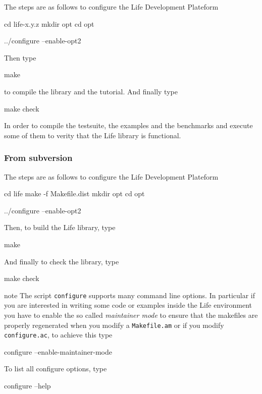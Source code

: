 \documentclass[a4paper]{book}
\newcommand{\ficnote}{note}
\newenvironment{note}{%
  \begin{pictonote}{\ficnote}}{\end{pictonote}}
\newcommand{\life}{Life\xspace}
\begin{document}
The steps are as follows to configure the \life Development Plateform

\begin{unixcom}
  cd life-x.y.z
  mkdir opt
  cd opt

  ../configure --enable-opt2
\end{unixcom}

Then type
\begin{unixcom}
  make
\end{unixcom}

to compile the library and the tutorial. And finally type
\begin{unixcom}
  make check
\end{unixcom}
In order to compile the testsuite, the examples and the benchmarks and
execute some of them to verity that the \life library is functional.


\subsubsection{From subversion}
\label{sec:from-subversion}

The steps are as follows to configure the \life Development Plateform

\begin{unixcom}
  cd life
  make -f Makefile.dist
  mkdir opt
  cd opt

  ../configure --enable-opt2
\end{unixcom}

Then, to build  the \life library, type
\begin{unixcom}
  make
\end{unixcom}

And finally to check the library, type
\begin{unixcom}
  make check
\end{unixcom}


\begin{note}
  The script \lstinline!configure! supports many command line
  options. In particular if you are interested in writing some code or
  examples inside the \life environment you have to enable the so
  called \emph{maintainer mode} to ensure that the makefiles are
  properly regenerated when you modify a \lstinline!Makefile.am! or if
  you modify \lstinline!configure.ac!, to achieve this type
  \begin{unixcom}
    configure --enable-maintainer-mode
  \end{unixcom}
  To list all configure options, type
  \begin{unixcom}
    configure --help
  \end{unixcom}
\end{note}
\end{document}

